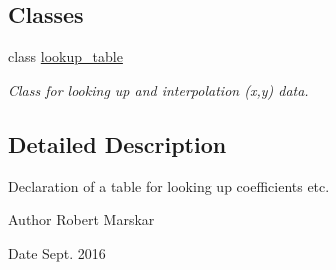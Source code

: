 \subsection*{Classes}
\begin{DoxyCompactItemize}
\item 
class \hyperlink{classlookup__table}{lookup\+\_\+table}
\begin{DoxyCompactList}\small\item\em Class for looking up and interpolation (x,y) data. \end{DoxyCompactList}\end{DoxyCompactItemize}


\subsection{Detailed Description}
Declaration of a table for looking up coefficients etc. 

\begin{DoxyAuthor}{Author}
Robert Marskar 
\end{DoxyAuthor}
\begin{DoxyDate}{Date}
Sept. 2016 
\end{DoxyDate}

